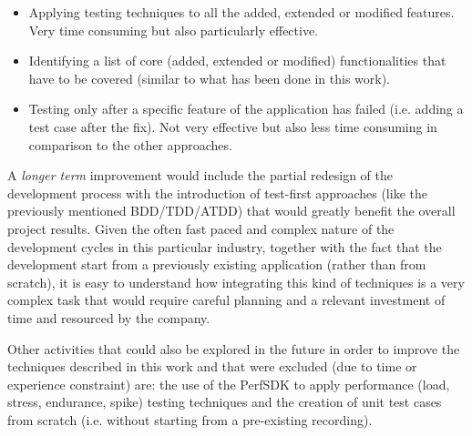 \begin{itemize}
    \item Applying testing techniques to all the added, extended or modified features. Very time consuming but also particularly effective.
    \item Identifying a list of core (added, extended or modified) functionalities that have to be covered (similar to what has been done in this work). 
    \item Testing only after a specific feature of the application has failed (i.e. adding a test case after the fix). Not very effective but also less time consuming in comparison to the other approaches. 
\end{itemize}
A \textit{longer term} improvement would include the partial redesign of the development process with the introduction of test-first approaches (like the previously mentioned BDD/TDD/ATDD) that would greatly benefit the overall project results. Given the often fast paced and complex nature of the development cycles in this particular industry, together with the fact that the development start from a previously existing application (rather than from scratch), it is easy to understand how integrating this kind of techniques is a very complex task that would require careful planning and a relevant investment of time and resourced by the company.

Other activities that could also be explored in the future in order to improve the techniques described in this work and that were excluded (due to time or experience constraint) are: the use of the PerfSDK to apply performance (load, stress, endurance, spike) testing techniques and the creation of unit test cases from scratch (i.e. without starting from a pre-existing recording).